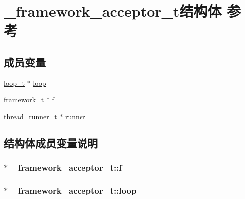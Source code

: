 \hypertarget{a00009}{}\section{\+\_\+framework\+\_\+acceptor\+\_\+t结构体 参考}
\label{a00009}
\subsection*{成员变量}
\begin{DoxyCompactItemize}
\item 
\hyperlink{a00047_a9c3ad1cd2de83e09f3a7b59fa82c94ee_a9c3ad1cd2de83e09f3a7b59fa82c94ee}{loop\+\_\+t} $\ast$ \hyperlink{a00009_a93591188445bc925ae168d82df309606_a93591188445bc925ae168d82df309606}{loop}
\item 
\hyperlink{a00047_a6149d769f6f07ed14a40a271c95d8463_a6149d769f6f07ed14a40a271c95d8463}{framework\+\_\+t} $\ast$ \hyperlink{a00009_ac4c16658712d2dbb58e61e6f59f2c8e2_ac4c16658712d2dbb58e61e6f59f2c8e2}{f}
\item 
\hyperlink{a00047_a9054159cde2f926ef61c28ce1e555199_a9054159cde2f926ef61c28ce1e555199}{thread\+\_\+runner\+\_\+t} $\ast$ \hyperlink{a00009_af7c10916c1636b7049e5ea2c12d8c294_af7c10916c1636b7049e5ea2c12d8c294}{runner}
\end{DoxyCompactItemize}


\subsection{结构体成员变量说明}
\hypertarget{a00009_ac4c16658712d2dbb58e61e6f59f2c8e2_ac4c16658712d2dbb58e61e6f59f2c8e2}{}
\subsubsection[{f}]{$\ast$ \+\_\+framework\+\_\+acceptor\+\_\+t\+::f}\label{a00009_ac4c16658712d2dbb58e61e6f59f2c8e2_ac4c16658712d2dbb58e61e6f59f2c8e2}
\hypertarget{a00009_a93591188445bc925ae168d82df309606_a93591188445bc925ae168d82df309606}{}
\subsubsection[{loop}]{$\ast$ \+\_\+framework\+\_\+acceptor\+\_\+t\+::loop}\label{a00009_a93591188445bc925ae168d82df309606_a93591188445bc925ae168d82df309606}
\hypertarget{a00009_af7c10916c1636b7049e5ea2c12d8c294_af7c10916c1636b7049e5ea2c12d8c294}{}
